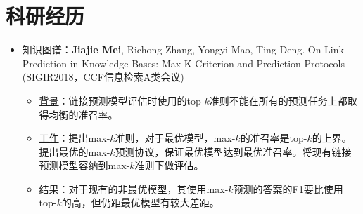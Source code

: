\documentclass{resume}
\begin{document}
\section{科研经历}
\begin{itemize}
	\item 知识图谱：{\bf Jiajie Mei}, Richong Zhang, Yongyi Mao, Ting Deng. On Link Prediction in Knowledge Bases: Max-K Criterion and Prediction Protocols (SIGIR2018，CCF信息检索A类会议)
	\begin{itemize}
		\item \underline{背景}：链接预测模型评估时使用的top-$k$准则不能在所有的预测任务上都取得均衡的准召率。
		\item \underline{工作}：提出max-$k$准则，对于最优模型，max-$k$的准召率是top-$k$的上界。提出最优的max-$k$预测协议，保证最优模型达到最优准召率。将现有链接预测模型容纳到max-$k$准则下做评估。
		\item \underline{结果}：对于现有的非最优模型，其使用max-$k$预测的答案的F1要比使用top-$k$的高，但仍距最优模型有较大差距。
	\end{itemize}


\end{itemize}
\end{document}
